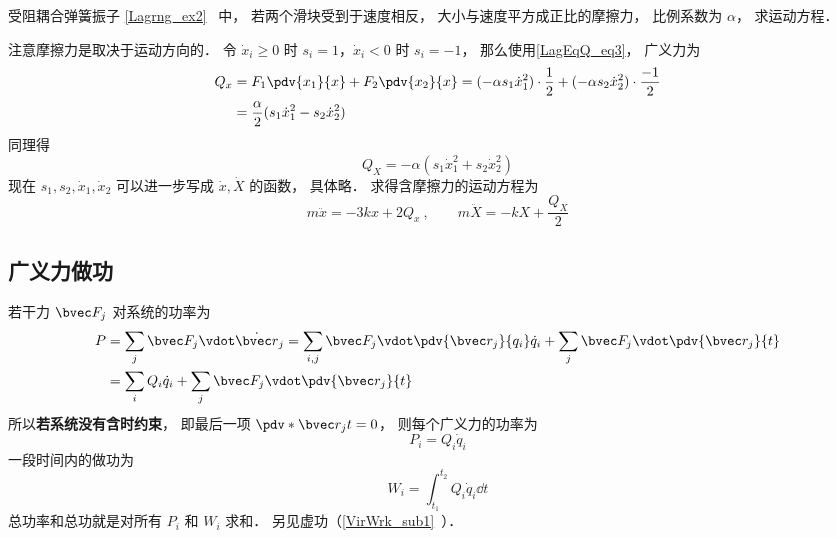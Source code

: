 \begin{example}{受阻耦合弹簧振子}
\autoref{Lagrng_ex2}~ 中， 若两个滑块受到于速度相反， 大小与速度平方成正比的摩擦力， 比例系数为 $\alpha$， 求运动方程．

注意摩擦力是取决于运动方向的． 令 $\dot x_i \geqslant 0$ 时 $s_i = 1$，$\dot x_i < 0$ 时 $s_i = -1$， 那么使用\autoref{LagEqQ_eq3}， 广义力为
\begin{equation}
\begin{aligned}
Q_x &= F_1 \pdv{x_1}{x} + F_2 \pdv{x_2}{x} = (-\alpha s_1\dot x_1^2) \cdot \frac{1}{2} + (-\alpha s_2\dot x_2^2) \cdot \frac{-1}{2}\\
&= \frac{\alpha}{2}(s_1\dot x_1^2 - s_2 \dot x_2^2)
\end{aligned}
\end{equation}
同理得
\begin{equation}
Q_X = -\alpha(s_1 \dot x_1^2 + s_2\dot x_2^2)
\end{equation}
现在 $s_1,s_2,\dot x_1,\dot x_2$ 可以进一步写成 $\dot x, \dot X$ 的函数， 具体略． 求得含摩擦力的运动方程为
\begin{equation}
m\ddot x =  - 3kx + 2Q_x~, \qquad
m\ddot X =  - kX + \frac{Q_X}{2}
\end{equation}
\end{example}

\subsection{广义力做功}
若干力 $\bvec F_j$ 对系统的功率为
\begin{equation}
\begin{aligned}
P &= \sum_j \bvec F_j \vdot \dot{\bvec r}_j
= \sum_{i,j} \bvec F_j \vdot \pdv{\bvec r_j}{q_i}\dot q_i + \sum_j \bvec F_j \vdot \pdv{\bvec r_j}{t}\\
&= \sum_i Q_i \dot q_i + \sum_j \bvec F_j \vdot \pdv{\bvec r_j}{t}
\end{aligned}
\end{equation}
所以\textbf{若系统没有含时约束}， 即最后一项 $\pdv*{\bvec r_j}{t} = 0$， 则每个广义力的功率为
\begin{equation}
P_i = Q_i \dot q_i
\end{equation}
一段时间内的做功为
\begin{equation}
W_i = \int_{t_1}^{t_2} Q_i \dot q_i \dd{t}
\end{equation}
总功率和总功就是对所有 $P_i$ 和 $W_i$ 求和． 另见虚功（\autoref{VirWrk_sub1}~）．
